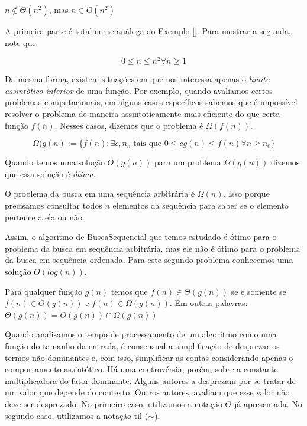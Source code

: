   \begin{example}
    $n \notin \Theta(n^2)$, mas $n \in O(n^2)$

    A primeira parte é totalmente análoga ao Exemplo \ref{}.
    Para mostrar a segunda, note que:

    \begin{displaymath}
     0 \leq n \leq n^2 \forall n \geq 1
    \end{displaymath}
  \end{example}

  Da mesma forma, existem situações em que nos interessa apenas o {\em limite assintótico inferior} de uma função.
  Por exemplo, quando avaliamos certos problemas computacionais, em alguns casos específicos sabemos que é impossível resolver o problema de maneira assintoticamente mais eficiente do que certa função $f(n)$.
  Nesses casos, dizemos que o problema é $\Omega(f(n))$.

  \begin{displaymath}
    \Omega(g(n) := \{f(n) : \exists c, n_o \textrm{ tais que } 0 \leq cg(n) \leq f(n) \forall n \geq n_0 \}
  \end{displaymath}

  Quando temos uma solução $O(g(n))$ para um problema $\Omega(g(n))$ dizemos que essa solução é {\em ótima}. 

  \begin{example}
    O problema da busca em uma sequência arbitrária é $\Omega(n)$.
    Isso porque precisamos consultar todos $n$ elementos da sequência para saber se o elemento pertence a ela ou não.

    Assim, o algoritmo de BuscaSequencial que temos estudado é ótimo para o problema da busca em sequência arbitrária, mas ele não é ótimo para o problema da busca em sequência ordenada.
    Para este segundo problema conhecemos uma solução $O(log(n))$.
  \end{example}

  \begin{theorem}
    Para qualquer função $g(n)$ temos que $f(n) \in \Theta(g(n))$ se e somente se $f(n) \in O(g(n))$ e $f(n) \in \Omega(g(n))$. Em outras palavras: $\Theta(g(n)) = O(g(n)) \cap \Omega(g(n))$
  \end{theorem}

  Quando analisamos o tempo de processamento de um algoritmo como uma função do tamanho da entrada, é consensual a simplificação de desprezar os termos não dominantes e, com isso, simplificar as contas considerando apenas o comportamento assintótico.
  Há uma controvérsia, porém, sobre a constante multiplicadora do fator dominante.
  Alguns autores a desprezam por se tratar de um valor que depende do contexto.
  Outros autores, avaliam que esse valor não deve ser desprezado.
  No primeiro caso, utilizamos a notação $\Theta$ já apresentada.
  No segundo caso, utilizamos a notação til ($\sim$).

